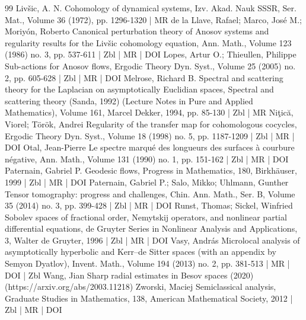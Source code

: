 \begin{thebibliography}{99}
Livšic, A. N. Cohomology of dynamical systems, Izv. Akad. Nauk SSSR, Ser. Mat., Volume 36 (1972), pp. 1296-1320 | MR
de la Llave, Rafael; Marco, José M.; Moriyón, Roberto Canonical perturbation theory of Anosov systems and regularity results for the Livšic cohomology equation, Ann. Math., Volume 123 (1986) no. 3, pp. 537-611 | Zbl | MR | DOI
Lopes, Artur O.; Thieullen, Philippe Sub-actions for Anosov flows, Ergodic Theory Dyn. Syst., Volume 25 (2005) no. 2, pp. 605-628 | Zbl | MR | DOI
Melrose, Richard B. Spectral and scattering theory for the Laplacian on asymptotically Euclidian spaces, Spectral and scattering theory (Sanda, 1992) (Lecture Notes in Pure and Applied Mathematics), Volume 161, Marcel Dekker, 1994, pp. 85-130 | Zbl | MR
Niţică, Viorel; Török, Andrei Regularity of the transfer map for cohomologous cocycles, Ergodic Theory Dyn. Syst., Volume 18 (1998) no. 5, pp. 1187-1209 | Zbl | MR | DOI
Otal, Jean-Pierre Le spectre marqué des longueurs des surfaces à courbure négative, Ann. Math., Volume 131 (1990) no. 1, pp. 151-162 | Zbl | MR | DOI
Paternain, Gabriel P. Geodesic flows, Progress in Mathematics, 180, Birkhäuser, 1999 | Zbl | MR | DOI
Paternain, Gabriel P.; Salo, Mikko; Uhlmann, Gunther Tensor tomography: progress and challenges, Chin. Ann. Math., Ser. B, Volume 35 (2014) no. 3, pp. 399-428 | Zbl | MR | DOI
Runst, Thomas; Sickel, Winfried Sobolev spaces of fractional order, Nemytskij operators, and nonlinear partial differential equations, de Gruyter Series in Nonlinear Analysis and Applications, 3, Walter de Gruyter, 1996 | Zbl | MR | DOI
Vasy, András Microlocal analysis of asymptotically hyperbolic and Kerr–de Sitter spaces (with an appendix by Semyon Dyatlov), Invent. Math., Volume 194 (2013) no. 2, pp. 381-513 | MR | DOI | Zbl
Wang, Jian Sharp radial estimates in Besov spaces (2020) (https://arxiv.org/abs/2003.11218)
Zworski, Maciej Semiclassical analysis, Graduate Studies in Mathematics, 138, American Mathematical Society, 2012 | Zbl | MR | DOI
\end{thebibliography}
